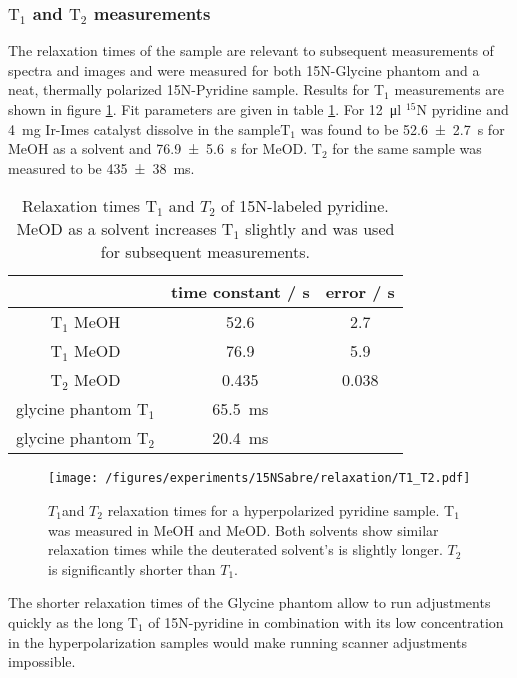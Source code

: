     \subsubsection{$\mathrm{T_1}$ and $\mathrm{T_2}$ measurements}
    The relaxation times of the sample are relevant to subsequent measurements of spectra and images and were measured for both 15N-Glycine phantom and a neat, thermally polarized 15N-Pyridine sample.
    Results for T$_1$ measurements are shown in figure \ref{fig:results:T1T2}. Fit parameters are given in table \ref{table:results:T1T2}. For \SI{12}{\micro\litre} $^{15}$N pyridine and \SI{4}{\milli\gram} Ir-Imes catalyst dissolve in the sample$\mathrm{T}_1$ was found to be \SI{52.6\pm 2.7}{\second} for MeOH as a solvent and \SI{76.9\pm 5.6}{\second} for MeOD. $\mathrm{T}_2$ for the same sample was measured to be \SI{435\pm 38}{\milli\second}.
        \begin{table}
            \begin{tabular}{|c|c|c|}
                \hline
                    & time constant / s & error / s\\
                    \hline
                $\mathrm{T_1}$ MeOH & 52.6 & 2.7  \\
                $\mathrm{T_1}$ MeOD & 76.9 & 5.9  \\
                $\mathrm{T_2}$ MeOD &  0.435 & 0.038 \\
                glycine phantom $\mathrm{T_1}$& \SI{65.5}{\milli\second}&  \\
                glycine phantom $\mathrm{T_2}$&\SI{20.4}{\milli\second} &  \\
                \hline
            \end{tabular}
            \caption[Relaxation times]{Relaxation times T$_1$ and $T_2$ of 15N-labeled pyridine. MeOD as a solvent increases T$_1$ slightly and was used for subsequent measurements.}
            \label{table:results:T1T2}
        \end{table}
        \begin{figure}
            \texttt{[image: /figures/experiments/15NSabre/relaxation/T1\_T2.pdf]}
            \caption[T1/T2 of 15N]{$T_1$and $T_2$ relaxation times for a hyperpolarized pyridine sample. T$_1$ was measured in MeOH and MeOD. Both solvents show similar relaxation times while the deuterated solvent's is slightly longer. $T_2$ is significantly shorter than $T_1$.}
            \label{fig:results:T1T2}
        \end{figure}
        The shorter relaxation times of the Glycine phantom allow to run adjustments quickly as the long T$_1$ of 15N-pyridine in combination with its low concentration in the hyperpolarization samples would make running scanner adjustments impossible.
